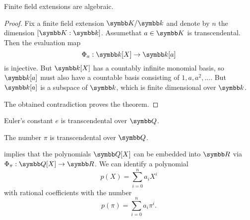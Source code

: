 \begin{proposition}\label{thm:finite_field_extensions_are_algebraic}
  Finite field extensions are algebraic.
\end{proposition}
\begin{proof}
  Fix a finite field extension \( \BK / \Bk \) and denote by \( n \) the dimension \( [\BK : \Bk] \). Assume\LEM that \( a \in \BK \) is transcendental. Then the evaluation map
  \begin{equation*}
    \Phi_a: \Bk[X] \to \Bk[a]
  \end{equation*}
  is injective. But \( \Bk[X] \) has a countably infinite monomial basis, so \( \Bk[a] \) must also have a countable basis consisting of \( 1, a, a^2, \ldots \). But \( \Bk[a] \) is a subspace of \( \Bk \), which is finite dimensional over \( \Bk \).

  The obtained contradiction proves the theorem.
\end{proof}

\begin{theorem}\label{thm:e_is_transcendental}\label{thm:eulers_constant_is_transcendental}
  Euler's constant \( e \) is transcendental over \( \BQ \).
\end{theorem}

\begin{theorem}\label{thm:pi_is_transcendental}\cite[454]{Knapp2016BAlg}
  The number \( \pi \) is transcendental over \( \BQ \).
\end{theorem}

\begin{example}\label{ex:polynomials_over_pi}
   implies that the polynomials \( \BQ[X] \) can be embedded into \( \BR \) via \( \Phi_\pi: \BQ[X] \to \BR \). We can identify a polynomial
  \begin{equation*}
    p(X) = \sum_{i=0}^n a_i X^i
  \end{equation*}
  with rational coefficients with the number
  \begin{equation*}
    p(\pi) = \sum_{i=0}^n a_i \pi^i.
  \end{equation*}
\end{example}

